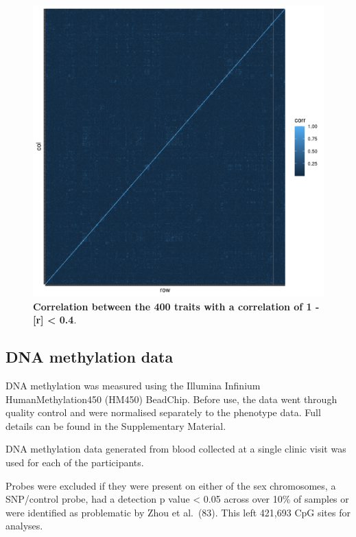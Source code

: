 \documentclass[11pt,oneside]{bristolthesis}
\begin{document}
\begin{figure}

{\centering \includegraphics[width=1\linewidth]{figure/05-h2ewas/test_correlation_plot} 

}

\caption[Correlation between the 400 traits with a correlation of 1 - {[}r{]} \textless{} 0.4]{\textbf{Correlation between the 400 traits with a correlation of 1 - {[}r{]} \textless{} 0.4}.}\label{fig:h2ewas-pheno-corr-subset}
\end{figure}
\hypertarget{dna-methylation-data-05}{%
\subsection{DNA methylation data}\label{dna-methylation-data-05}}

DNA methylation was measured using the Illumina Infinium HumanMethylation450 (HM450) BeadChip. Before use, the data went through quality control and were normalised separately to the phenotype data. Full details can be found in the Supplementary Material.

DNA methylation data generated from blood collected at a single clinic visit was used for each of the participants.

Probes were excluded if they were present on either of the sex chromosomes, a SNP/control probe, had a detection p value \textless{} 0.05 across over 10\% of samples or were identified as problematic by Zhou et al.~(83). This left 421,693 CpG sites for analyses.
\end{document}
